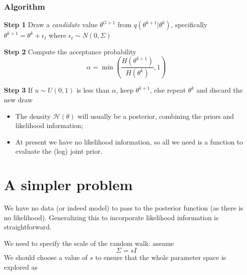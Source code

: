 \documentclass[
  letterpaper,
]{book}
\providecommand{\tightlist}{%
  \setlength{\itemsep}{0pt}\setlength{\parskip}{0pt}}\usepackage{longtable,booktabs,array}
\begin{document}
\hypertarget{algorithm}{%
\subsubsection{Algorithm}\label{algorithm}}

\textbf{Step 1} Draw a \emph{candidate} value \(\theta^{G+1}\) from
\(q(\theta^{k+1}|\theta^k)\), specifically
\(\theta^{k+1} = \theta^k + \epsilon_t\) where
\(\epsilon_t\sim N(0,\Sigma)\)

\textbf{Step 2} Compute the acceptance probability \[
  \alpha = \min \left(\frac{H(\theta^{k+1})}{H(\theta^k)}, 1\right)
\]

\textbf{Step 3} If \(u\sim U(0,1)\) is less than \(\alpha\), keep
\(\theta^{k+1}\), else repeat \(\theta^k\) and discard the new draw

\begin{tcolorbox}[enhanced jigsaw, breakable, left=2mm, arc=.35mm, toptitle=1mm, colbacktitle=quarto-callout-note-color!10!white, opacityback=0, bottomrule=.15mm, leftrule=.75mm, opacitybacktitle=0.6, title=\textcolor{quarto-callout-note-color}{\faInfo}\hspace{0.5em}{Note}, colframe=quarto-callout-note-color-frame, coltitle=black, titlerule=0mm, toprule=.15mm, bottomtitle=1mm, rightrule=.15mm, colback=white]

\begin{itemize}
\tightlist
\item
  The density \(\mathcal{H}(\theta)\) will usually be a posterior,
  combining the priors and likelihood information;
\item
  At present we have no likelihood information, so all we need is a
  function to evaluate the (log) joint prior.
\end{itemize}

\end{tcolorbox}

\hypertarget{a-simpler-problem}{%
\section{A simpler problem}\label{a-simpler-problem}}

We have no data (or indeed model) to pass to the posterior function (as
there is no likelihood). Generalizing this to incorporate likelihood
information is straightforward.

We need to specify the scale of the random walk: assume \[
  \Sigma = sI
\] We should choose a value of \(s\) to ensure that the whole parameter
space is explored as
\end{document}
